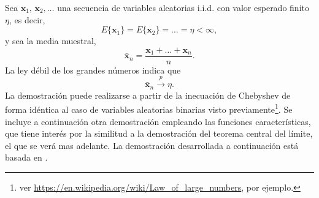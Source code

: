 \documentclass[a4paper]{report}
\newcommand{\x}{\mathbf{x}}
\begin{document}
Sea \(\x_1,\,\x_2,\dots\) una secuencia de variables aleatorias i.i.d. con valor esperado finito \(\eta\), es decir,
\[
 E\{\x_1\}=E\{\x_2\}=\dots=\eta<\infty,
\]
y sea la media muestral,
\[
 \bar{\x}_n=\frac{\x_1+\dots+\x_n}{n}.
\]
La ley débil de los grandes números indica que
\[
 \bar{\x}_n\overset{p}{\longrightarrow}\eta.
\]
La demostración puede realizarse a partir de la inecuación de Chebyshev de forma idéntica al caso de variables aleatorias binarias visto previamente\footnote{ver \url{https://en.wikipedia.org/wiki/Law_of_large_numbers}, por ejemplo.}. Se incluye a continuación otra demostración empleando las funciones características, que tiene interés por la similitud a la demostración del teorema central del límite, el que se verá mas adelante. La demostración desarrollada a continuación está basada en \cite{polyanskiy18lec17}.
\end{document}
